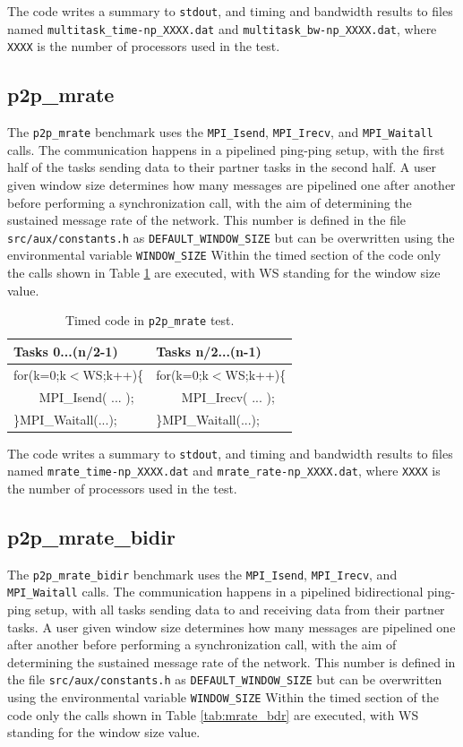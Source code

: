\documentclass[10pt,a4paper]{report}
\begin{document}
The code writes a summary to \verb+stdout+, and timing and bandwidth results to files named \verb+multitask_time-np_XXXX.dat+ and \verb+multitask_bw-np_XXXX.dat+, where \verb+XXXX+ is the number of processors used in the test.

\FloatBarrier
\subsection{p2p\_mrate}
The \verb+p2p_mrate+ benchmark uses the \verb+MPI_Isend+, \verb+MPI_Irecv+, and \verb+MPI_Waitall+ calls. The communication happens in a pipelined ping-ping setup, with the first half of the tasks sending data to their partner tasks in the second half. A user given window size determines how many messages are pipelined one after another before performing a synchronization call, with the aim of determining the sustained message rate of the network. This number is defined in the file \verb+src/aux/constants.h+ as \verb+DEFAULT_WINDOW_SIZE+ but can be overwritten using the environmental variable \verb+WINDOW_SIZE+  Within the timed section of the code only the calls shown in Table \ref{tab:mrate} are executed, with WS standing for the window size value.

\begin{table}[ht]
\centering
\caption{Timed code in \texttt{p2p\_mrate} test.}
\label{tab:mrate}
\begin{tabular}{|l|l|}
\hline
\bf{Tasks 0...(n/2-1)}	& \bf{Tasks n/2...(n-1)}\\\hline
for(k=0;k$<$WS;k++)\{     & for(k=0;k$<$WS;k++)\{ \\
\verb+    +MPI\_Isend( ... );      & \verb+    +MPI\_Irecv( ... );\\
\}MPI\_Waitall(...);    & \}MPI\_Waitall(...);\\\hline
\end{tabular}
\end{table}

The code writes a summary to \verb+stdout+, and timing and bandwidth results to files named \verb+mrate_time-np_XXXX.dat+ and \verb+mrate_rate-np_XXXX.dat+, where \verb+XXXX+ is the number of processors used in the test.

\FloatBarrier

\subsection{p2p\_mrate\_bidir}
The \verb+p2p_mrate_bidir+ benchmark uses the \verb+MPI_Isend+, \verb+MPI_Irecv+, and \verb+MPI_Waitall+ calls. The communication happens in a pipelined bidirectional ping-ping setup, with all tasks sending data to and receiving data from their partner tasks. A user given window size determines how many messages are pipelined one after another before performing a synchronization call, with the aim of determining the sustained message rate of the network. This number is defined in the file \verb+src/aux/constants.h+ as \verb+DEFAULT_WINDOW_SIZE+ but can be overwritten using the environmental variable \verb+WINDOW_SIZE+  Within the timed section of the code only the calls shown in Table \ref{tab:mrate_bdr} are executed, with WS standing for the window size value.
\end{document}
